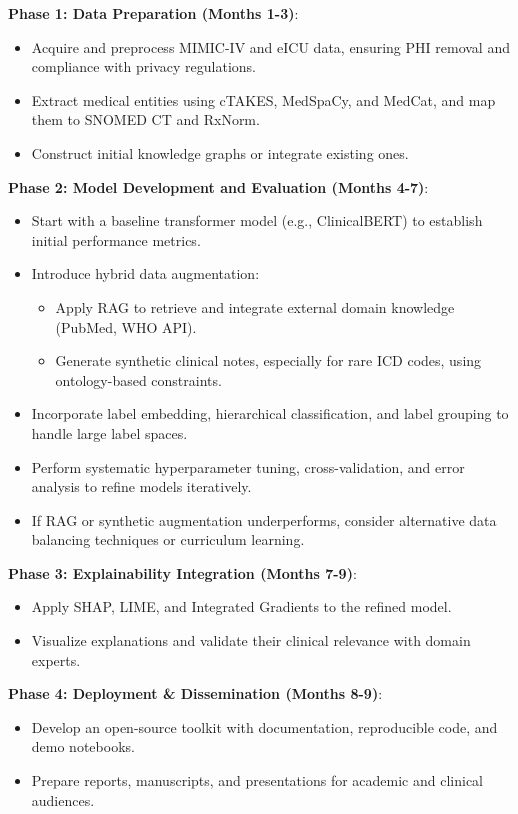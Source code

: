 \documentclass[10pt,a4paper]{article}
\begin{document}
\textbf{Phase 1: Data Preparation (Months 1-3)}:
\begin{itemize}
    \item Acquire and preprocess MIMIC-IV and eICU data, ensuring PHI removal and compliance with privacy regulations.
    \item Extract medical entities using cTAKES, MedSpaCy, and MedCat, and map them to SNOMED CT and RxNorm.
    \item Construct initial knowledge graphs or integrate existing ones.  
\end{itemize}

\textbf{Phase 2: Model Development and Evaluation (Months 4-7)}:
\begin{itemize}
    \item Start with a baseline transformer model (e.g., ClinicalBERT) to establish initial performance metrics.
    \item Introduce hybrid data augmentation:
        \begin{itemize}
            \item Apply RAG to retrieve and integrate external domain knowledge (PubMed, WHO API).
            \item Generate synthetic clinical notes, especially for rare ICD codes, using ontology-based constraints.
        \end{itemize}
    \item Incorporate label embedding, hierarchical classification, and label grouping to handle large label spaces.
    \item Perform systematic hyperparameter tuning, cross-validation, and error analysis to refine models iteratively.
    \item If RAG or synthetic augmentation underperforms, consider alternative data balancing techniques or curriculum learning.
\end{itemize}

\textbf{Phase 3: Explainability Integration (Months 7-9)}:
\begin{itemize}
    \item Apply SHAP, LIME, and Integrated Gradients to the refined model.
    \item Visualize explanations and validate their clinical relevance with domain experts.
\end{itemize}

\textbf{Phase 4: Deployment \& Dissemination (Months 8-9)}:
\begin{itemize}
    \item Develop an open-source toolkit with documentation, reproducible code, and demo notebooks.
    \item Prepare reports, manuscripts, and presentations for academic and clinical audiences.
\end{itemize}
\end{document}
